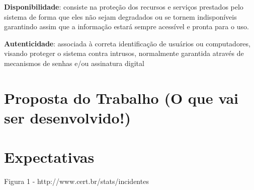 \documentclass[
	12pt,				%
	openright,			%
	oneside,
	a4paper,			%
	english,			%
	french,				%
	spanish,			%
	brazil				%
	]{abntex2}
\begin{document}
\textbf{Disponibilidade}: consiste na proteção dos recursos e serviços prestados pelo sistema de forma que eles não sejam degradados ou se tornem indisponíveis garantindo assim que a informação estará sempre acessível e pronta para o uso.

\textbf{Autenticidade}: associada à correta identificação de usuários ou computadores, visando proteger o sistema contra intrusos, normalmente garantida através de mecanismos de senhas e/ou assinatura digital
 

\chapter[Proposta do Trabalho]{Proposta do Trabalho (O que vai ser desenvolvido!)}


\chapter[Expectativas]{Expectativas}


\postextual


Figura 1 - http://www.cert.br/stats/incidentes
\end{document}
